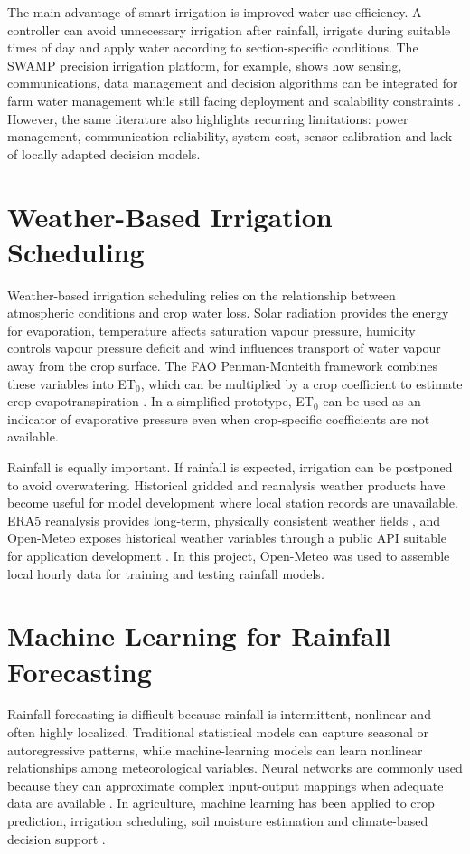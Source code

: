 \documentclass[12pt,a4paper]{report}
\begin{document}
The main advantage of smart irrigation is improved water use efficiency. A controller can avoid unnecessary irrigation after rainfall, irrigate during suitable times of day and apply water according to section-specific conditions. The SWAMP precision irrigation platform, for example, shows how sensing, communications, data management and decision algorithms can be integrated for farm water management while still facing deployment and scalability constraints \citep{kamienski2019smart}. However, the same literature also highlights recurring limitations: power management, communication reliability, system cost, sensor calibration and lack of locally adapted decision models.

\section{Weather-Based Irrigation Scheduling}
Weather-based irrigation scheduling relies on the relationship between atmospheric conditions and crop water loss. Solar radiation provides the energy for evaporation, temperature affects saturation vapour pressure, humidity controls vapour pressure deficit and wind influences transport of water vapour away from the crop surface. The FAO Penman-Monteith framework combines these variables into ET$_0$, which can be multiplied by a crop coefficient to estimate crop evapotranspiration \citep{allen1998crop}. In a simplified prototype, ET$_0$ can be used as an indicator of evaporative pressure even when crop-specific coefficients are not available.

Rainfall is equally important. If rainfall is expected, irrigation can be postponed to avoid overwatering. Historical gridded and reanalysis weather products have become useful for model development where local station records are unavailable. ERA5 reanalysis provides long-term, physically consistent weather fields \citep{hersbach2020era5}, and Open-Meteo exposes historical weather variables through a public API suitable for application development \citep{openmeteo2026historical}. In this project, Open-Meteo was used to assemble local hourly data for training and testing rainfall models.

\section{Machine Learning for Rainfall Forecasting}
Rainfall forecasting is difficult because rainfall is intermittent, nonlinear and often highly localized. Traditional statistical models can capture seasonal or autoregressive patterns, while machine-learning models can learn nonlinear relationships among meteorological variables. Neural networks are commonly used because they can approximate complex input-output mappings when adequate data are available \citep{goodfellow2016deep}. In agriculture, machine learning has been applied to crop prediction, irrigation scheduling, soil moisture estimation and climate-based decision support \citep{liakos2018machine}.
\end{document}

